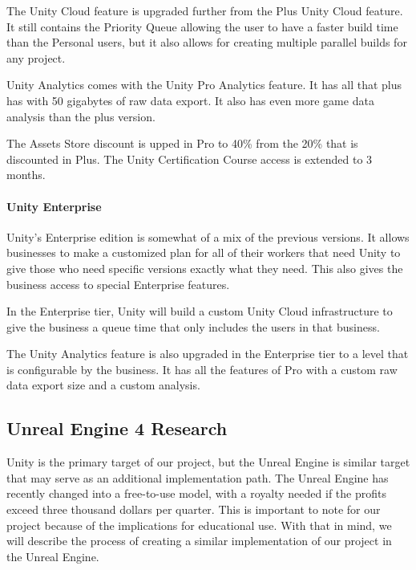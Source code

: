 \documentclass[12pt]{article}
\begin{document}
The Unity Cloud feature is upgraded further from the Plus Unity Cloud
feature. It still contains the Priority Queue allowing the user to have
a faster build time than the Personal users, but it also allows for
creating multiple parallel builds for any project.

Unity Analytics comes with the Unity Pro Analytics feature. It has all
that plus has with 50 gigabytes of raw data export. It also has even
more game data analysis than the plus version.

The Assets Store discount is upped in Pro to 40\% from the 20\% that is
discounted in Plus. The Unity Certification Course access is extended to
3 months. \autocite{unityTable}

\paragraph{Unity Enterprise}\label{unity-enterprise}

Unity's Enterprise edition is somewhat of a mix of the previous
versions. It allows businesses to make a customized plan for all of
their workers that need Unity to give those who need specific versions
exactly what they need. This also gives the business access to special
Enterprise features.

In the Enterprise tier, Unity will build a custom Unity Cloud
infrastructure to give the business a queue time that only includes the
users in that business.

The Unity Analytics feature is also upgraded in the Enterprise tier to a
level that is configurable by the business. It has all the features of
Pro with a custom raw data export size and a custom analysis.
\autocite{unityTable}

\subsection{Unreal Engine 4 Research}\label{unreal-engine-4-research}

Unity is the primary target of our project, but the Unreal Engine is
similar target that may serve as an additional implementation path. The
Unreal Engine has recently changed into a free-to-use model, with a
royalty needed if the profits exceed three thousand dollars per quarter.
This is important to note for our project because of the implications
for educational use. With that in mind, we will describe the process of
creating a similar implementation of our project in the Unreal Engine.
\end{document}
